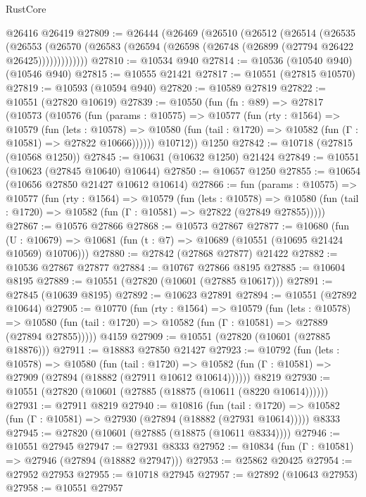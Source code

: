 \begin{lexlean}{RustCore}
\begin{coremodule}
    @26416
    @26419
@27809 := @26444
    (@26469
      (@26510
        (@26512
          (@26514
            (@26535
              (@26553
                (@26570 (@26583 (@26594 (@26598 (@26748 (@26899 (@27794 @26422 @26425)))))))))))))
@27810 := @10534 @940
@27814 := @10536 (@10540 @940) (@10546 @940)
@27815 := @10555 @21421
@27817 := @10551 (@27815 @10570)
@27819 := @10593 (@10594 @940)
@27820 := @10589 @27819
@27822 := @10551 (@27820 @10619)
@27839 := @10550
    (fun (fn : @89) =>
    @27817
      (@10573
        (@10576
          (fun (params : @10575) =>
          @10577
            (fun (rty : @1564) =>
            @10579
              (fun (lets : @10578) =>
              @10580 (fun (tail : @1720) => @10582 (fun (Γ : @10581) => @27822 @10666))))))
        @10712))
    @1250
@27842 := @10718 (@27815 (@10568 @1250))
@27845 := @10631 (@10632 @1250) @21424
@27849 := @10551 (@10623 (@27845 @10640) @10644)
@27850 := @10657 @1250
@27855 := @10654 (@10656 @27850 @21427 @10612 @10614)
@27866 := fun (params : @10575) =>
  @10577
    (fun (rty : @1564) =>
    @10579
      (fun (lets : @10578) =>
      @10580 (fun (tail : @1720) => @10582 (fun (Γ : @10581) => @27822 (@27849 @27855)))))
@27867 := @10576 @27866
@27868 := @10573 @27867
@27877 := @10680
    (fun (U : @10679) => @10681 (fun (t : @7) => @10689 (@10551 (@10695 @21424 @10569) @10706)))
@27880 := @27842 (@27868 @27877) @21422
@27882 := @10536 @27867 @27877
@27884 := @10767 @27866 @8195
@27885 := @10604 @8195
@27889 := @10551 (@27820 (@10601 (@27885 @10617)))
@27891 := @27845 (@10639 @8195)
@27892 := @10623 @27891
@27894 := @10551 (@27892 @10644)
@27905 := @10770
    (fun (rty : @1564) =>
    @10579
      (fun (lets : @10578) =>
      @10580 (fun (tail : @1720) => @10582 (fun (Γ : @10581) => @27889 (@27894 @27855)))))
    @4159
@27909 := @10551 (@27820 (@10601 (@27885 @18876)))
@27911 := @18883 @27850 @21427
@27923 := @10792
    (fun (lets : @10578) =>
    @10580
      (fun (tail : @1720) =>
      @10582 (fun (Γ : @10581) => @27909 (@27894 (@18882 (@27911 @10612 @10614))))))
    @8219
@27930 := @10551 (@27820 (@10601 (@27885 (@18875 (@10611 (@8220 @10614))))))
@27931 := @27911 @8219
@27940 := @10816
    (fun (tail : @1720) => @10582 (fun (Γ : @10581) => @27930 (@27894 (@18882 (@27931 @10614)))))
    @8333
@27945 := @27820 (@10601 (@27885 (@18875 (@10611 @8334))))
@27946 := @10551 @27945
@27947 := @27931 @8333
@27952 := @10834 (fun (Γ : @10581) => @27946 (@27894 (@18882 @27947)))
@27953 := @25862 @20425
@27954 := @27952 @27953
@27955 := @10718 @27945
@27957 := @27892 (@10643 @27953)
@27958 := @10551 @27957

\end{coremodule}
\end{lexlean}
